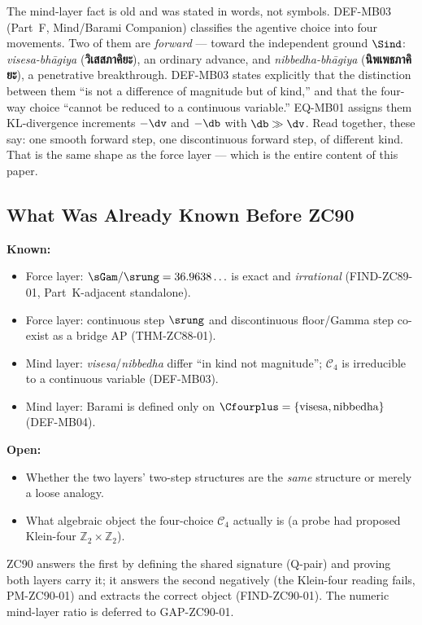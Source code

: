 \documentclass[12pt, a4paper]{article}
\begin{document}
The mind-layer fact is old and was stated in words, not symbols. DEF-MB03
(Part~F, Mind/Barami Companion) classifies the agentive choice into four
movements. Two of them are \emph{forward} --- toward the independent
ground $\Sind$: \emph{visesa-bhāgiya} (\textbf{วิเสสภาคิยะ}), an ordinary
advance, and \emph{nibbedha-bhāgiya} (\textbf{นิพเพธภาคิยะ}), a
penetrative breakthrough. DEF-MB03 states explicitly that the distinction
between them ``is not a difference of magnitude but of kind,'' and that
the four-way choice ``cannot be reduced to a continuous variable.''
EQ-MB01 assigns them KL-divergence increments $-\dv$ and $-\db$ with
$\db\gg\dv$. Read together, these say: one smooth forward step, one
discontinuous forward step, of different kind. That is the same shape as
the force layer --- which is the entire content of this paper.

\subsection{What Was Already Known Before ZC90}

\begin{keybox}[title={Pre-ZC90 Status}]
\textbf{Known:}
\begin{itemize}[leftmargin=2em, noitemsep]
  \item Force layer: $\sGam/\srung=36.9638\ldots$ is exact and
    \emph{irrational} (FIND-ZC89-01, Part~K-adjacent standalone).
  \item Force layer: continuous step $\srung$ and discontinuous
    floor/Gamma step co-exist as a bridge AP (THM-ZC88-01).
  \item Mind layer: \emph{visesa}/\emph{nibbedha} differ ``in kind not
    magnitude''; $\mathcal{C}_4$ is irreducible to a continuous variable
    (DEF-MB03).
  \item Mind layer: Barami is defined only on
    $\Cfourplus=\{\text{visesa},\text{nibbedha}\}$ (DEF-MB04).
\end{itemize}

\textbf{Open:}
\begin{itemize}[leftmargin=2em, noitemsep]
  \item Whether the two layers' two-step structures are the \emph{same}
    structure or merely a loose analogy.
  \item What algebraic object the four-choice $\mathcal{C}_4$ actually is
    (a probe had proposed Klein-four $\mathbb{Z}_2\times\mathbb{Z}_2$).
\end{itemize}

ZC90 answers the first by defining the shared signature (Q-pair) and
proving both layers carry it; it answers the second negatively (the
Klein-four reading fails, PM-ZC90-01) and extracts the correct object
(FIND-ZC90-01). The numeric mind-layer ratio is deferred to GAP-ZC90-01.
\end{keybox}
\end{document}

